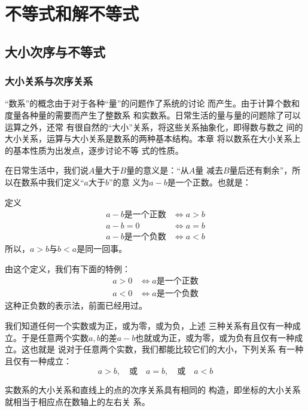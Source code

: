 \chapter{不等式和解不等式}

\section{大小次序与不等式}

\subsection{大小关系与次序关系}

“数系”的概念由于对于各种“量”的问题作了系统的讨论
而产生。由于计算个数和度量各种量的需要而产生了整数系
和实数系。日常生活的量与量的问题除了可以运算之外，还常
有很自然的“大小”关系，将这些关系抽象化，即得数与数之
间的大小关系，运算与大小关系是数系的两种基本结构。本章
将以数系在大小关系上的基本性质为出发点，逐步讨论不等
式的性质。

在日常生活中，我们说$A$量大于$B$量的意义是：“从$A$量
减去$B$量后还有剩余”，所以在数系中我们定义“$a$大于$b$”的意
义为$a-b$是一个正数。也就是：

\begin{blk}{定义}
\[\begin{split}
    a-b\text{是一个正数}&\Longleftrightarrow a>b\\
    a-b=0  &\Longleftrightarrow a=b\\
    a-b\text{是一个负数}&\Longleftrightarrow a<b
\end{split}\]
所以，$a>b$与$b<a$是同一回事。
\end{blk}


由这个定义，我们有下面的特例：
\[\begin{split}
    a>0 &\Longleftrightarrow a\text{是一个正数}\\
    a<0&\Longleftrightarrow a\text{是一个负数} 
\end{split}\]
这种正负数的表示法，前面已经用过。

我们知道任何一个实数或为正，或为零，或为负，上述
三种关系有且仅有一种成立。于是任意两个实数$a,b$的差$a-
b$也就或为正，或为零，或为负有且仅有一种成立。这也就是
说对于任意两个实数，我们都能比较它们的大小，下列关系
有一种且仅有一种成立：
\[a>b,\quad \text{或}\quad a=b,\quad  \text{或}\quad a<b\]

实数系的大小关系和直线上的点的次序关系具有相同的
构造，即坐标的大小关系就相当于相应点在数轴上的左右关
系。

